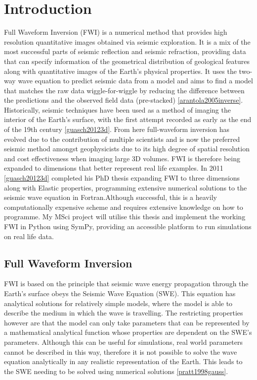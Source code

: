 \chapter{Introduction}
\label{intro}


Full Waveform Inversion (FWI) is a numerical method that provides high resolution quantitative images obtained via seismic exploration. It is a mix of the most successful parts of seismic reflection and seismic refraction, providing data that can specify information of the geometrical distribution of geological features along with quantitative images of the Earth's physical properties. 
It uses the two-way wave equation to predict seismic data from a model and aims to find a model that matches the raw data wiggle-for-wiggle by reducing the difference between the predictions and the observed field data (pre-stacked) \ref{arantola2005inverse}. 
\\ 
Historically, seismic techniques have been used as a method of imaging the interior of the Earth's surface, with the first attempt recorded as early as the end of the 19th century \ref{guasch20123d}. From here full-waveform inversion has evolved due to the contribution of multiple scientists and is now the preferred seismic method amongst geophysicists due to its high degree of spatial resolution and cost effectiveness when imaging large 3D volumes. FWI is therefore being expanded to dimensions that better represent real life examples. In 2011 \ref{guasch20123d} completed his PhD thesis expanding FWI to three dimensions along with Elastic properties, programming extensive numerical solutions to the seismic wave equation in Fortran.Although successful, this is a heavily computationally expensive scheme and requires extensive knowledge on how to programme. My MSci project will utilise this thesis and implement the working FWI in Python using SymPy, providing an accessible platform to run simulations on real life data.   

\section{Full Waveform Inversion } 
FWI is based on the principle that seismic wave energy propagation through the Earth’s surface obeys the Seismic Wave Equation (SWE). This equation has analytical solutions for relatively simple models, where the model is able to describe the medium in which the wave is travelling. The restricting properties however are that the model can only take parameters that can be represented by a mathematical analytical function whose properties are dependent on the SWE's parameters. Although this can be useful for simulations, real world parameters cannot be described in this way, therefore it is not possible to solve the wave equation analytically in any realistic representation of the Earth. This leads to the SWE needing to be solved using numerical solutions \ref{pratt1998gauss}. 

